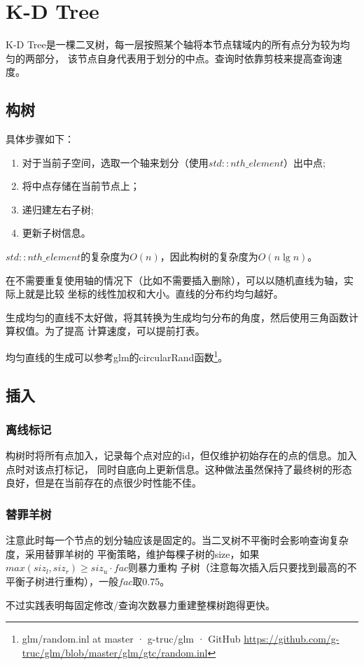 \section{K-D Tree}
K-D Tree是一棵二叉树，每一层按照某个轴将本节点辖域内的所有点分为较为均匀的两部分，
该节点自身代表用于划分的中点。查询时依靠剪枝来提高查询速度。
\subsection{构树}
具体步骤如下：
\begin{enumerate}
	\item 对于当前子空间，选取一个轴来划分（使用$std::nth\_element$）出中点;
	\item 将中点存储在当前节点上；
	\item 递归建左右子树;
	\item 更新子树信息。
\end{enumerate}
$std::nth\_element$的复杂度为$O(n)$，因此构树的复杂度为$O(n\lg n)$。

在不需要重复使用轴的情况下（比如不需要插入删除），可以以随机直线为轴，实际上就是比较
坐标的线性加权和大小。直线的分布约均匀越好。

生成均匀的直线不太好做，将其转换为生成均匀分布的角度，然后使用三角函数计算权值。为了提高
计算速度，可以提前打表。

均匀直线的生成可以参考glm的circularRand函数\footnote{
    glm/random.inl at master · g-truc/glm · GitHub
    \url{https://github.com/g-truc/glm/blob/master/glm/gtc/random.inl}
}。
\subsection{插入}
\subsubsection{离线标记}
构树时将所有点加入，记录每个点对应的id，但仅维护初始存在的点的信息。加入点时对该点打标记，
同时自底向上更新信息。这种做法虽然保持了最终树的形态良好，但是在当前存在的点很少时性能不佳。
\subsubsection{替罪羊树}
注意此时每一个节点的划分轴应该是固定的。当二叉树不平衡时会影响查询复杂度，采用替罪羊树的
平衡策略，维护每棵子树的size，如果$max(siz_l,siz_r)\geq siz_u \cdot fac$则暴力重构
子树（注意每次插入后只要找到最高的不平衡子树进行重构），一般$fac$取0.75。

不过实践表明每固定修改/查询次数暴力重建整棵树跑得更快。

